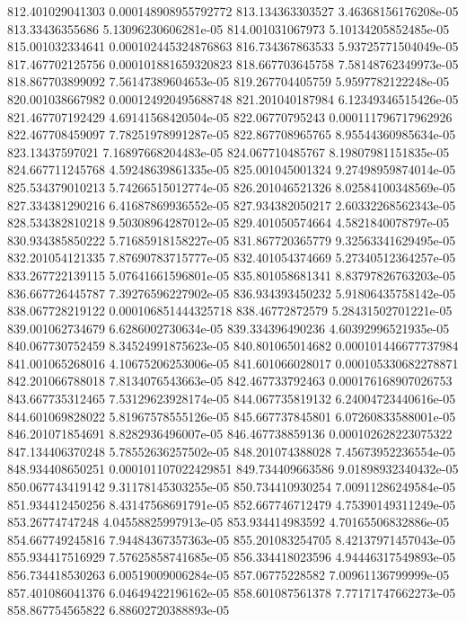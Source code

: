 {812.401029041303 0.000148908955792772
813.134363303527 3.46368156176208e-05
813.33436355686 5.13096230606281e-05
814.001031067973 5.10134205852485e-05
815.001032334641 0.000102445324876863
816.734367863533 5.93725771504049e-05
817.467702125756 0.000101881659320823
818.667703645758 7.58148762349973e-05
818.867703899092 7.56147389604653e-05
819.267704405759 5.9597782122248e-05
820.001038667982 0.000124920495688748
821.201040187984 6.12349346515426e-05
821.467707192429 4.69141568420504e-05
822.06770795243 0.000111796717962926
822.467708459097 7.78251978991287e-05
822.867708965765 8.95544360985634e-05
823.13437597021 7.16897668204483e-05
824.067710485767 8.19807981151835e-05
824.667711245768 4.59248639861335e-05
825.001045001324 9.27498959874014e-05
825.534379010213 5.74266515012774e-05
826.201046521326 8.02584100348569e-05
827.334381290216 6.41687869936552e-05
827.934382050217 2.60332268562343e-05
828.534382810218 9.50308964287012e-05
829.401050574664 4.5821840078797e-05
830.934385850222 5.71685918158227e-05
831.867720365779 9.32563341629495e-05
832.201054121335 7.87690783715777e-05
832.401054374669 5.27340512364257e-05
833.267722139115 5.07641661596801e-05
835.801058681341 8.83797826763203e-05
836.667726445787 7.39276596227902e-05
836.934393450232 5.91806435758142e-05
838.067728219122 0.000106851444325718
838.46772872579 5.28431502701221e-05
839.001062734679 6.6286002730634e-05
839.334396490236 4.60392996521935e-05
840.067730752459 8.34524991875623e-05
840.801065014682 0.000101446677737984
841.001065268016 4.10675206253006e-05
841.601066028017 0.000105330682278871
842.201066788018 7.8134076543663e-05
842.467733792463 0.000176168907026753
843.667735312465 7.53129623928174e-05
844.067735819132 6.24004723440616e-05
844.601069828022 5.81967578555126e-05
845.667737845801 6.07260833588001e-05
846.201071854691 8.8282936496007e-05
846.467738859136 0.000102628223075322
847.134406370248 5.78552636257502e-05
848.201074388028 7.45673952236554e-05
848.934408650251 0.000101107022429851
849.734409663586 9.01898932340432e-05
850.067743419142 9.31178145303255e-05
850.734410930254 7.00911286249584e-05
851.934412450256 8.43147568691791e-05
852.667746712479 4.75390149311249e-05
853.26774747248 4.04558825997913e-05
853.934414983592 4.70165506832886e-05
854.667749245816 7.94484367357363e-05
855.201083254705 8.42137971457043e-05
855.934417516929 7.57625858741685e-05
856.334418023596 4.94446317549893e-05
856.734418530263 6.00519009006284e-05
857.06775228582 7.00961136799999e-05
857.401086041376 6.04649422196162e-05
858.601087561378 7.77171747662273e-05
858.867754565822 6.88602720388893e-05
}
